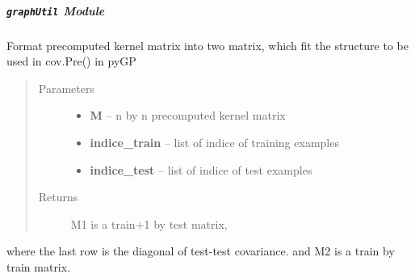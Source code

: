 \documentclass[letterpaper,10pt,english]{sphinxmanual}
\begin{document}
\subparagraph{\texttt{graphUtil} Module}
\label{pyGPs.GraphExtensions:graphutil-module}\label{pyGPs.GraphExtensions:module-pyGPs.GraphExtensions.graphUtil}

\begin{fulllineitems}
\label{pyGPs.GraphExtensions:pyGPs.GraphExtensions.graphUtil.formKernelMatrix}
Format precomputed kernel matrix into two matrix,
which fit the structure to be used in cov.Pre() in pyGP
\begin{quote}\begin{description}
\item[{Parameters}] \leavevmode\begin{itemize}
\item {} 
\textbf{M} -- n by n precomputed kernel matrix

\item {} 
\textbf{indice\_train} -- list of indice of training examples

\item {} 
\textbf{indice\_test} -- list of indice of test examples

\end{itemize}

\item[{Returns}] \leavevmode
M1 is a train+1 by test matrix,

\end{description}\end{quote}

where the last row is the diagonal of test-test covariance.
and M2 is a train by train matrix.

\end{fulllineitems}

\end{document}

